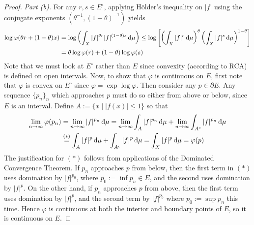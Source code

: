 \begin{proof}
    \emph{Part (b).} For any \(r, s \in E^\circ\), applying H\"older's inequality on \(|f|\) using the conjugate exponents \((\theta^{-1}, (1 - \theta)^{-1})\) yields
    \begin{align*}
        \log \varphi(\theta r + (1 - \theta) x) 
        &= \log \left( \int_X |f|^{\theta r} |f|^{(1 - \theta) s} \, \mathrm{d}\mu \right)
        \leq \log \left[ \left( \int_X |f|^r \, \mathrm{d}\mu \right)^\theta \left( \int_X |f|^s \, \mathrm{d}\mu \right)^{1 - \theta} \right] \\
        &= \theta \log \varphi(r) + (1 - \theta) \log \varphi(s)
    \end{align*}
    Note that we must look at \(E^\circ\) rather than \(E\) since convexity (according to RCA) is defined on open intervals. Now, to show that \(\varphi\) is continuous on \(E\), first note that \(\varphi\) is convex on \(E^\circ\) since \(\varphi = \exp \log \varphi\). Then consider any \(p \in \partial E\). Any sequence \(\{p_n\}_n\) which approaches \(p\) must do so either from above or below, since \(E\) is an interval. Define \(A := \{ x \mid |f(x)| \leq 1 \}\) so that 
    \begin{align*}
        \lim_{n \to \infty} \varphi(p_n) 
        &= \lim_{n \to \infty} |f|^{p_n} \, \mathrm{d}\mu 
        = \lim_{n \to \infty} \int_A |f|^{p_n} \, \mathrm{d}\mu + \lim_{n \to \infty} \int_{A^c} |f|^{p_n} \, \mathrm{d}\mu \\
        &\stackrel{(*)}{=} \int_A |f|^p \, \mathrm{d}\mu + \int_{A^c} |f|^p \, \mathrm{d}\mu
        = \int_X |f|^p \, \mathrm{d}\mu
        = \varphi(p)
    \end{align*}
    The justification for \((*)\) follows from applications of the Dominated Convergence Theorem. If \(p_n\) approaches \(p\) from below, then the first term in \((*)\) uses domination by \(|f|^{p_0}\), where \(p_0 := \inf p_n \in E\), and the second uses domination by \(|f|^p\). On the other hand, if \(p_n\) approaches \(p\) from above, then the first term uses domination by \(|f|^p\), and the second term by \(|f|^{p_0}\) where \(p_0 := \sup p_n\) this time. Hence \(\varphi\) is continuous at both the interior and boundary points of \(E\), so it is continuous on \(E\). 
\end{proof}

